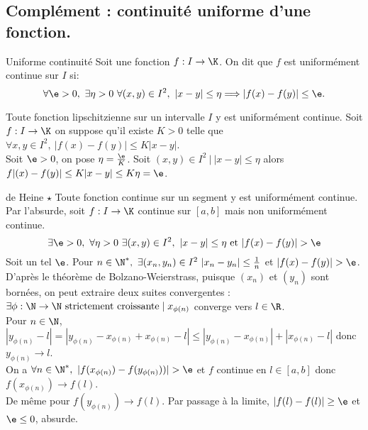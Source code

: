 \documentclass[11pt]{article}
\begin{document}
\subsection{Complément : continuité uniforme d'une fonction.}

\begin{defi}{Uniforme continuité}{}
    Soit une fonction $f:I\to\K$. On dit que $f$ est uniformément continue sur $I$ si:
    \begin{equation*}
        \forall \e>0, ~ \exists \eta > 0 ~ \forall (x,y) \in I^2, ~ |x-y|\leq\eta \Longrightarrow |f(x)-f(y)|\leq\e.
    \end{equation*}
\end{defi}

\begin{prop}{}{}
    Toute fonction lipschitzienne sur un intervalle $I$ y est uniformément continue.
    \tcblower
    Soit $f:I\to\K$ on suppose qu'il existe $K>0$ telle que $\forall x,y\in I^2, ~ |f(x)-f(y)|\leq K|x-y|$.\\
    Soit $\e>0$, on pose $\eta=\frac{\e}{K}$. Soit $(x,y)\in I^2 ~ | ~ |x-y|\leq\eta$ alors $f|(x)-f(y)|\leq K|x-y| \leq K\eta = \e$.
\end{prop}

\begin{thm}{de Heine $\star$}{}
    Toute fonction continue sur un segment y est uniformément continue.
    \tcblower
    Par l'absurde, soit $f:I\to\K$ continue sur $[a,b]$ mais non uniformément continue.
    \begin{equation*}
        \exists \e > 0, ~ \forall \eta > 0 ~ \exists (x,y)\in I^2, ~ |x-y|\leq\eta \text{ et } |f(x)-f(y)|>\e 
    \end{equation*}
    Soit un tel $\e$. Pour $n\in\N^*, ~ \exists(x_n,y_n)\in I^2 ~ |x_n-y_n| \leq \frac{1}{n}$ et $|f(x)-f(y)|>\e$.\\
    D'après le théorème de Bolzano-Weierstrass, puisque $(x_n)$ et $(y_n)$ sont bornées, on peut extraire deux suites convergentes : $\exists \phi:\N\to\N \text{ strictement croissante} \mid x_{\phi(n)}$ converge vers $l\in\R$.\\
    Pour $n\in\N$, $|y_{\phi(n)}-l|=|y_{\phi(n)}-x_{\phi(n)}+x_{\phi(n)}-l|\leq|y_{\phi(n)}-x_{\phi(n)}|+|x_{\phi(n)}-l|$ donc $y_{\phi(n)}\to l$.\\
    On a $\forall n\in\N^*, ~ |f(x_{\phi(n)})-f(y_{\phi(n)}))|>\e$ et $f$ continue en $l\in[a,b]$ donc $f(x_{\phi(n)})\to f(l)$.\\
    De même pour $f(y_{\phi(n)})\to f(l)$. Par passage à la limite, $|f(l)-f(l)|\geq\e$ et $\e\leq0$, absurde.
\end{thm}
\end{document}
